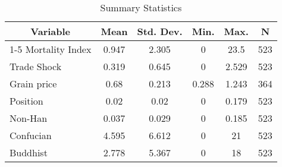 
\begin{table}[htbp]\centering \caption{Summary Statistics  \label{tab:sumstats}}
\begin{tabular}{l c c c c c}\hline
\multicolumn{1}{c}{\textbf{Variable}} & \textbf{Mean}
 & \textbf{Std. Dev.}& \textbf{Min.} &  \textbf{Max.} & \textbf{N}\\ \hline
1-5 Mortality Index & 0.947 & 2.305 & 0 & 23.5 & 523\\
Trade Shock & 0.319 & 0.645 & 0 & 2.529 & 523\\
Grain price & 0.68 & 0.213 & 0.288 & 1.243 & 364\\
Position & 0.02 & 0.02 & 0 & 0.179 & 523\\
Non-Han & 0.037 & 0.029 & 0 & 0.185 & 523\\
Confucian & 4.595 & 6.612 & 0 & 21 & 523\\
Buddhist & 2.778 & 5.367 & 0 & 18 & 523\\
\hline\end{tabular}
\end{table}
